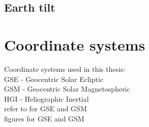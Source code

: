 \subsection{Earth tilt}


\section{Coordinate systems}
\label{sec:coordinate_systems}

Coordinate systems used in this thesis:\\
GSE - Geocentric Solar Ecliptic\\
GSM - Geocentric Solar Magnetospheric\\
HGI - Heliographic Inertial\\

refer to \citet{Hapgood1992} for GSE and GSM\\

figures for GSE and GSM



  

